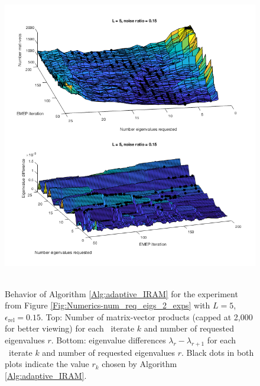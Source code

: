 \begin{figure}[H]
\centering
\hbox{\hspace{-0.5cm} \includegraphics[scale=0.65]{Numerics-surf_num_mvs_and_eig_diffs_1} }\vspace{0.0cm}
	\caption{Behavior of Algorithm \ref{Alg:adaptive_IRAM} for the experiment from Figure \ref{Fig:Numerics-num_req_eigs_2_exps} with $L=5$, $\epsilon_\text{rel}=0.15$.  Top: Number of matrix-vector products (capped at 2,000 for better viewing) for each \emep \ iterate $k$ and number of requested eigenvalues $r$. Bottom: eigenvalue differences $\lambda_r - \lambda_{r+1}$ for each \emep \ iterate $k$ and number of requested eigenvalues $r$.  Black dots in both plots indicate the value $r_k$ chosen by Algorithm \ref{Alg:adaptive_IRAM}.}
\label{Fig:Numerics-surf_mvs_eig_diffs_1}
\end{figure}



